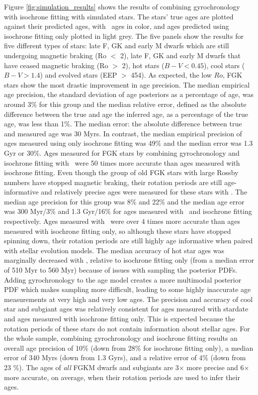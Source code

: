 Figure \ref{fig:simulation_results} shows the results of combining
gyrochronology with isochrone fitting with simulated stars.
The stars' true ages are plotted against their predicted ages, with \sd\ ages
in color, and ages predicted using isochrone fitting only plotted in light
grey.
The five panels show the results for five different types of stars: late F, GK
and early M dwarfs which are still undergoing magnetic braking (Ro $<$ 2),
late F, GK and early M dwarfs that have ceased magnetic braking (Ro $>$ 2),
hot stars ($B-V < 0.45$), cool stars ($B-V > 1.4$) and evolved stars (EEP $>$
454).
As expected, the low $Ro$, FGK stars show the most drastic improvement in age
precision.
The median empirical age precision, the standard deviation of age posteriors
as a percentage of age, was around 3\% for this group and the median relative
error, defined as the absolute difference between the true and age the
inferred age, as a percentage of the true age, was less than 1\%.
The median error: the absolute difference between true and measured age was
30 Myrs.
In contrast, the median empirical precision of ages measured using only
isochrone fitting was 49\% and the median error was 1.3 Gyr or 30\%.
Ages measured for FGK stars by combining gyrochronology and isochrone fitting
with \sd\ were 50 times more accurate than ages measured with isochrone
fitting.
Even though the group of old FGK stars with large Rossby numbers have stopped
magnetic braking, their rotation periods are still age-informative and
relatively precise ages were measured for these stars with \sd.
The median age precision for this group was 8\% and 22\% and the median age
error was 300 Myr/3\% and 1.3 Gyr/16\% for ages measured with \sd\ and
isochrone fitting respectively.
Ages measured with \sd\ were over 4 times more accurate than ages measured
with isochrone fitting only, so although these stars have stopped spinning
down, their rotation periods are still highly age informative when paired with
stellar evolution models.
The median accuracy of hot star ages was marginally decreased with \sd,
relative to isochrone fitting only (from a median error of 510 Myr to 560 Myr)
because of issues with sampling the posterior PDFs.
Adding gyrochronology to the age model creates a more multimodal posterior PDF
which makes sampling more difficult, leading to some highly inaccurate age
measurements at very high and very low ages.
The precision and accuracy of cool star and subgiant ages was relatively
consistent for ages measured with stardate and ages measured with isochrone
fitting only.
This is expected because the rotation periods of these stars do not contain
information about stellar ages.
For the whole sample, combining gyrochronology and isochrone fitting results
an overall age precision of 10\% (down from 28\% for isochrone fitting only),
a median error of 340 Myrs (down from 1.3 Gyrs), and a relative error of 4\%
(down from 23 \%).
The ages of {\it all} FGKM dwarfs and subgiants are 3$\times$ more precise and
6$\times$ more accurate, on average, when their rotation periods are used to
infer their ages.

